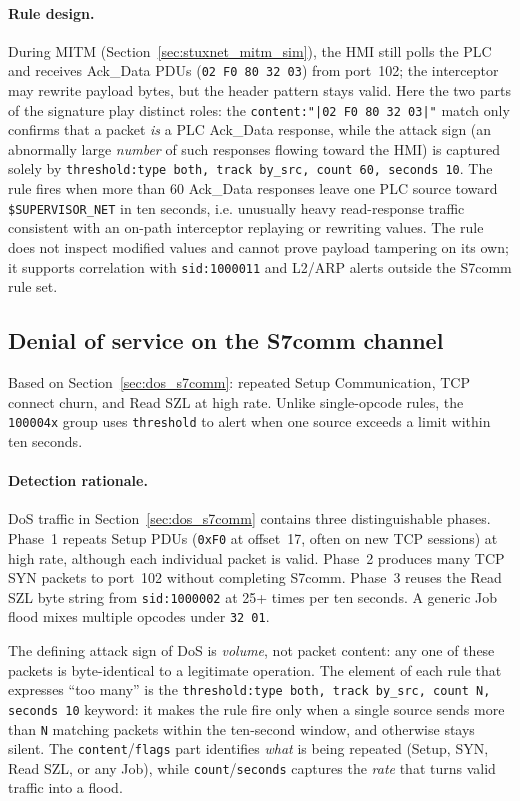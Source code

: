\documentclass[../main.tex]{subfiles}
\begin{document}
\paragraph{Rule design.}
During MITM (Section~\ref{sec:stuxnet_mitm_sim}), the HMI still polls the PLC and receives Ack\_Data PDUs (\texttt{02 F0 80 32 03}) from port~102; the interceptor may rewrite payload bytes, but the header pattern stays valid. Here the two parts of the signature play distinct roles: the \texttt{content:"|02 F0 80 32 03|"} match only confirms that a packet \emph{is} a PLC Ack\_Data response, while the attack sign (an abnormally large \emph{number} of such responses flowing toward the HMI) is captured solely by \texttt{threshold:type both, track by\_src, count 60, seconds 10}. The rule fires when more than 60 Ack\_Data responses leave one PLC source toward \texttt{\$SUPERVISOR\_NET} in ten seconds, i.e. unusually heavy read-response traffic consistent with an on-path interceptor replaying or rewriting values. The rule does not inspect modified values and cannot prove payload tampering on its own; it supports correlation with \texttt{sid:1000011} and L2/ARP alerts outside the S7comm rule set.

\subsection{Denial of service on the S7comm channel}
\label{sec:rules-dos}

Based on Section~\ref{sec:dos_s7comm}: repeated Setup Communication, TCP connect churn, and Read SZL at high rate. Unlike single-opcode rules, the \texttt{100004x} group uses \texttt{threshold} to alert when one source exceeds a limit within ten seconds.

\paragraph{Detection rationale.}
DoS traffic in Section~\ref{sec:dos_s7comm} contains three distinguishable phases. Phase~1 repeats Setup PDUs (\texttt{0xF0} at offset~17, often on new TCP sessions) at high rate, although each individual packet is valid. Phase~2 produces many TCP SYN packets to port~102 without completing S7comm. Phase~3 reuses the Read SZL byte string from \texttt{sid:1000002} at 25+ times per ten seconds. A generic Job flood mixes multiple opcodes under \texttt{32 01}.

The defining attack sign of DoS is \emph{volume}, not packet content: any one of these packets is byte-identical to a legitimate operation. The element of each rule that expresses ``too many'' is the \texttt{threshold:type both, track by\_src, count N, seconds 10} keyword: it makes the rule fire only when a single source sends more than \texttt{N} matching packets within the ten-second window, and otherwise stays silent. The \texttt{content}/\texttt{flags} part identifies \emph{what} is being repeated (Setup, SYN, Read SZL, or any Job), while \texttt{count}/\texttt{seconds} captures the \emph{rate} that turns valid traffic into a flood.
\end{document}
